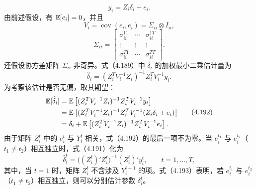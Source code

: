 \begin{equation}
y_i=Z_i\delta_i+e_i.\tag{4.189}
\end{equation}
由前述假设，有 $\mathbb{E}[e_i]=0$，并且
\begin{equation}
V_i=\operatorname{cov}(e_i,e_i)=\Sigma_{ii}\otimes I_n,\tag{4.190}
\end{equation}
\[
\Sigma_{ii}=\begin{bmatrix}
\sigma_{ii}^{11}&\cdots&\sigma_{ii}^{1T}\\
\vdots&\vdots&\vdots\\
\sigma_{ii}^{T1}&\cdots&\sigma_{ii}^{TT}
\end{bmatrix}.
\]
还假设协方差矩阵 $\Sigma_{ii}$ 非奇异。式（4.189）中 $\delta_i$ 的加权最小二乘估计量为
\begin{equation}
\widehat\delta_i=(Z_i^TV_i^{-1}Z_i)^{-1}Z_i^TV_i^{-1}y_i.\tag{4.191}
\end{equation}
为考察该估计是否无偏，取其期望：
\begin{equation}
\begin{aligned}
\mathbb{E}[\widehat\delta_i]
 &=\mathbb{E}\left[(Z_i^TV_i^{-1}Z_i)^{-1}Z_i^TV_i^{-1}y_i\right]\\
 &=\mathbb{E}\left[(Z_i^TV_i^{-1}Z_i)^{-1}Z_i^TV_i^{-1}(Z_i\delta_i+e_i)\right]\\
 &=\delta_i+\mathbb{E}\left[(Z_i^TV_i^{-1}Z_i)^{-1}Z_i^TV_i^{-1}e_i\right].
\end{aligned}\tag{4.192}
\end{equation}
由于矩阵 $Z_i^t$ 中的 $e_i^t$ 与 $Y_i^t$ 相关，式（4.192）的最后一项不为零。当 $e_i^{t_1}$ 与 $e_i^{t_2}$（$t_1\ne t_2$）相互独立时，式（4.191）化为
\begin{equation}
\widehat\delta_i^t=
 \bigl((Z_i^t)'Z_i^t\bigr)^{-1}(Z_i^t)'y_i^t,
\qquad t=1,\ldots,T,\tag{4.193}
\end{equation}
其中，当 $t=1$ 时，矩阵 $Z_i^t$ 不含涉及 $Y_i^{t-1}$ 的项。式（4.193）表明，若 $e_i^{t_1}$ 与 $e_i^{t_2}$（$t_1\ne t_2$）相互独立，则可以分别估计参数 $\delta_i^t$。

